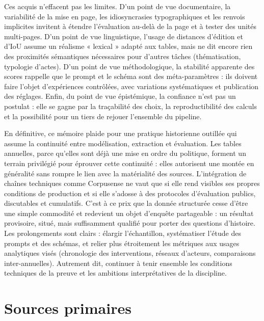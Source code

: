\documentclass[12pt,twoside]{book}
\begin{document}
Ces acquis n’effacent pas les limites. D’un point de vue documentaire, la variabilité de la mise en page, les idiosyncrasies typographiques et les renvois implicites invitent à étendre l’évaluation au-delà de la page et à tester des unités multi-pages. D’un point de vue linguistique, l’usage de distances d’édition et d’IoU assume un réalisme « lexical » adapté aux tables, mais ne dit encore rien des proximités sémantiques nécessaires pour d’autres tâches (thématisation, typologie d’actes). D’un point de vue méthodologique, la stabilité apparente des scores rappelle que le prompt et le schéma sont des méta-paramètres : ils doivent faire l’objet d’expériences contrôlées, avec variations systématiques et publication des réglages. Enfin, du point de vue épistémique, la confiance n’est pas un postulat : elle se gagne par la traçabilité des choix, la reproductibilité des calculs et la possibilité pour un tiers de rejouer l’ensemble du pipeline.

En définitive, ce mémoire plaide pour une pratique historienne outillée qui assume la continuité entre modélisation, extraction et évaluation. Les tables annuelles, parce qu’elles sont déjà une mise en ordre du politique, forment un terrain privilégié pour éprouver cette continuité : elles autorisent une montée en généralité sans rompre le lien avec la matérialité des sources. L’intégration de chaînes techniques comme Corpusense ne vaut que si elle rend visibles ses propres conditions de production et si elle s’adosse à des protocoles d’évaluation publics, discutables et cumulatifs. C’est à ce prix que la donnée structurée cesse d’être une simple commodité et redevient un objet d’enquête partageable : un résultat provisoire, situé, mais suffisamment qualifié pour porter des questions d’histoire. Les prolongements sont clairs : élargir l’échantillon, systématiser l’étude des prompts et des schémas, et relier plus étroitement les métriques aux usages analytiques visés (chronologie des interventions, réseaux d’acteurs, comparaisons inter-annuelles). Autrement dit, continuer à tenir ensemble les conditions techniques de la preuve et les ambitions interprétatives de la discipline.



\appendix
\chapter[Annexes A]{Sources primaires}\label{ann:A}
\end{document}
